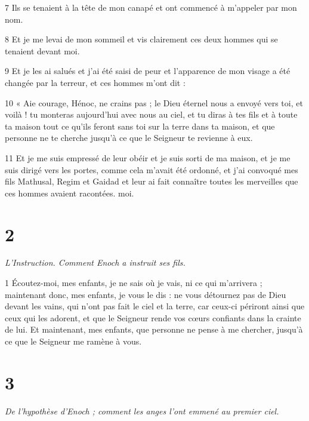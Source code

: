 \par 7 Ils se tenaient à la tête de mon canapé et ont commencé à m'appeler par mon nom.

\par 8 Et je me levai de mon sommeil et vis clairement ces deux hommes qui se tenaient devant moi.

\par 9 Et je les ai salués et j'ai été saisi de peur et l'apparence de mon visage a été changée par la terreur, et ces hommes m'ont dit :

\par 10 « Aie courage, Hénoc, ne crains pas ; le Dieu éternel nous a envoyé vers toi, et voilà ! tu monteras aujourd'hui avec nous au ciel, et tu diras à tes fils et à toute ta maison tout ce qu'ils feront sans toi sur la terre dans ta maison, et que personne ne te cherche jusqu'à ce que le Seigneur te revienne à eux.

\par 11 Et je me suis empressé de leur obéir et je suis sorti de ma maison, et je me suis dirigé vers les portes, comme cela m'avait été ordonné, et j'ai convoqué mes fils Mathusal, Regim et Gaidad et leur ai fait connaître toutes les merveilles que ces hommes avaient racontées. moi.

\chapter{2}

\par \textit{L'Instruction. Comment Enoch a instruit ses fils.}

\par 1 Écoutez-moi, mes enfants, je ne sais où je vais, ni ce qui m'arrivera ; maintenant donc, mes enfants, je vous le dis : ne vous détournez pas de Dieu devant les vains, qui n'ont pas fait le ciel et la terre, car ceux-ci périront ainsi que ceux qui les adorent, et que le Seigneur rende vos cœurs confiants dans la crainte de lui. Et maintenant, mes enfants, que personne ne pense à me chercher, jusqu'à ce que le Seigneur me ramène à vous.

\chapter{3}

\par \textit{De l'hypothèse d'Enoch ; comment les anges l'ont emmené au premier ciel.}

